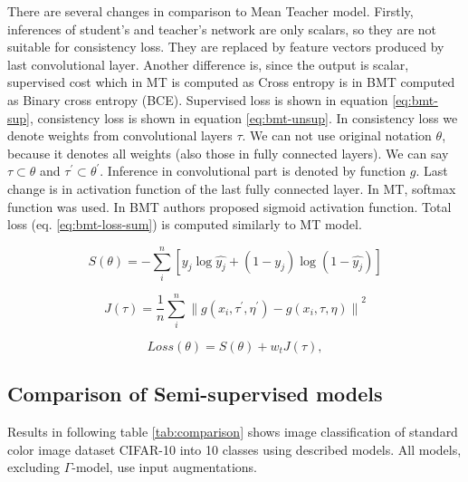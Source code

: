 There are several changes in comparison to Mean Teacher model. 
Firstly, inferences of student's and teacher's network are only scalars, so they are not suitable for consistency loss. They are replaced by feature vectors produced by last convolutional layer. Another difference is, since the output is scalar, supervised cost which in MT is computed as Cross entropy is in BMT computed as Binary cross entropy (BCE). Supervised loss is shown in equation \ref{eq:bmt-sup}, consistency loss is shown in equation \ref{eq:bmt-unsup}. In consistency loss we denote weights from convolutional layers $\tau$. We can not use original notation $\theta$, because it denotes all weights (also those in fully connected layers). We can say $\tau \subset \theta$ and $\tau^{\prime} \subset \theta^{\prime}$. Inference in convolutional part is denoted by function $g$. Last change is in activation function of the last fully connected layer. In MT, softmax function was used. In BMT authors proposed sigmoid activation function. Total loss (eq. \ref{eq:bmt-loss-sum}) is computed similarly to MT model.


\begin{equation}
	S(\theta) = - \sum_{i}^{n}[y_j \log{\hat{y_j}} + (1-y_j)\log{(1-\hat{y_j})}]
	\label{eq:bmt-sup}
\end{equation} 

\begin{equation}
    J(\tau) = \frac{1}{n} \sum_i^n {\| g(x_i,\tau^{\prime},\eta^{\prime}) - g(x_i,\tau,\eta) \|}^2
	\label{eq:bmt-unsup}
\end{equation} 

\begin{equation}
	Loss(\theta) = S(\theta) + w_t J(\tau),
	\label{eq:bmt-loss-sum}
\end{equation} 

\subsection{Comparison of Semi-supervised models}

Results in following table \ref{tab:comparison} shows image classification of standard color image dataset CIFAR-10 into 10 classes using described models. All models, excluding $\Gamma$-model, use input augmentations.

